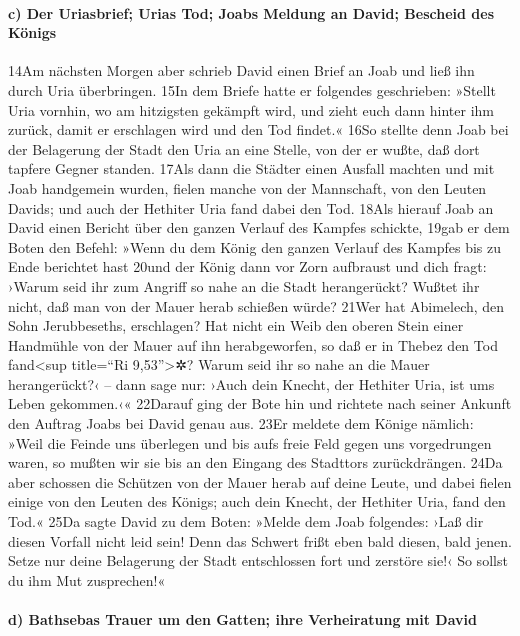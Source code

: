 \hypertarget{c-der-uriasbrief-urias-tod-joabs-meldung-an-david-bescheid-des-kuxf6nigs}{%
\paragraph{c) Der Uriasbrief; Urias Tod; Joabs Meldung an David;
Bescheid des
Königs}\label{c-der-uriasbrief-urias-tod-joabs-meldung-an-david-bescheid-des-kuxf6nigs}}

14Am nächsten Morgen aber schrieb David einen Brief an Joab und ließ ihn
durch Uria überbringen. 15In dem Briefe hatte er folgendes geschrieben:
»Stellt Uria vornhin, wo am hitzigsten gekämpft wird, und zieht euch
dann hinter ihm zurück, damit er erschlagen wird und den Tod findet.«
16So stellte denn Joab bei der Belagerung der Stadt den Uria an eine
Stelle, von der er wußte, daß dort tapfere Gegner standen. 17Als dann
die Städter einen Ausfall machten und mit Joab handgemein wurden, fielen
manche von der Mannschaft, von den Leuten Davids; und auch der Hethiter
Uria fand dabei den Tod. 18Als hierauf Joab an David einen Bericht über
den ganzen Verlauf des Kampfes schickte, 19gab er dem Boten den Befehl:
»Wenn du dem König den ganzen Verlauf des Kampfes bis zu Ende berichtet
hast 20und der König dann vor Zorn aufbraust und dich fragt: ›Warum seid
ihr zum Angriff so nahe an die Stadt herangerückt? Wußtet ihr nicht, daß
man von der Mauer herab schießen würde? 21Wer hat Abimelech, den Sohn
Jerubbeseths, erschlagen? Hat nicht ein Weib den oberen Stein einer
Handmühle von der Mauer auf ihn herabgeworfen, so daß er in Thebez den
Tod fand\textless sup title=``Ri 9,53''\textgreater✲? Warum seid ihr so
nahe an die Mauer herangerückt?‹ -- dann sage nur: ›Auch dein Knecht,
der Hethiter Uria, ist ums Leben gekommen.‹« 22Darauf ging der Bote hin
und richtete nach seiner Ankunft den Auftrag Joabs bei David genau aus.
23Er meldete dem Könige nämlich: »Weil die Feinde uns überlegen und bis
aufs freie Feld gegen uns vorgedrungen waren, so mußten wir sie bis an
den Eingang des Stadttors zurückdrängen. 24Da aber schossen die Schützen
von der Mauer herab auf deine Leute, und dabei fielen einige von den
Leuten des Königs; auch dein Knecht, der Hethiter Uria, fand den Tod.«
25Da sagte David zu dem Boten: »Melde dem Joab folgendes: ›Laß dir
diesen Vorfall nicht leid sein! Denn das Schwert frißt eben bald diesen,
bald jenen. Setze nur deine Belagerung der Stadt entschlossen fort und
zerstöre sie!‹ So sollst du ihm Mut zusprechen!«

\hypertarget{d-bathsebas-trauer-um-den-gatten-ihre-verheiratung-mit-david}{%
\paragraph{d) Bathsebas Trauer um den Gatten; ihre Verheiratung mit
David}\label{d-bathsebas-trauer-um-den-gatten-ihre-verheiratung-mit-david}}

